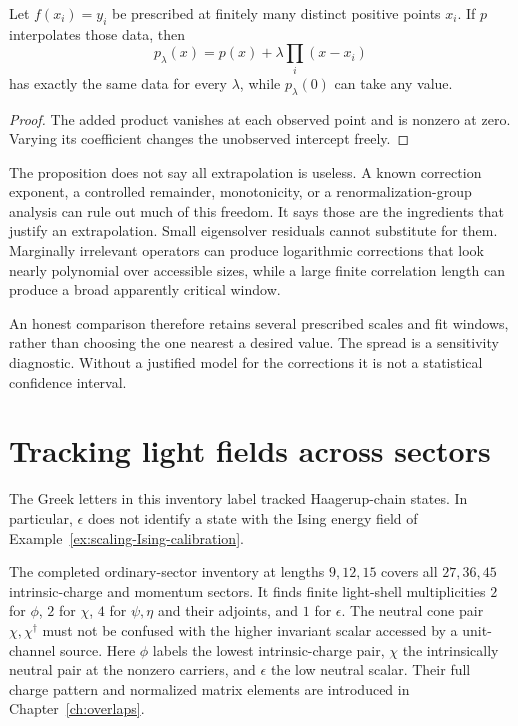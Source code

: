 \begin{proposition}
Let $f(x_i)=y_i$ be prescribed at finitely many distinct positive points
$x_i$. If $p$ interpolates those data, then
\[
 p_\lambda(x)=p(x)+\lambda\prod_i(x-x_i)
\]
has exactly the same data for every $\lambda$, while $p_\lambda(0)$ can
take any value.
\end{proposition}
\begin{proof}
The added product vanishes at each observed point and is nonzero at
zero. Varying its coefficient changes the unobserved intercept freely.
\end{proof}

The proposition does not say all extrapolation is useless. A known
correction exponent, a controlled remainder, monotonicity, or a
renormalization-group analysis can rule out much of this freedom.
It says those are the ingredients that justify an extrapolation. Small
eigensolver residuals cannot substitute for them. Marginally irrelevant
operators can produce logarithmic corrections that look nearly
polynomial over accessible sizes, while a large finite correlation
length can produce a broad apparently critical window.

An honest comparison therefore retains several prescribed scales and
fit windows, rather than choosing the one nearest a desired value.
The spread is a sensitivity diagnostic. Without a justified model for
the corrections it is not a statistical confidence interval.

\section{Tracking light fields across sectors}

The Greek letters in this inventory label tracked Haagerup-chain
states. In particular, $\epsilon$ does not identify a state with the
Ising energy field of Example~\ref{ex:scaling-Ising-calibration}.

The completed ordinary-sector inventory at lengths $9,12,15$ covers
all $27,36,45$ intrinsic-charge and momentum sectors. It finds finite
light-shell multiplicities $2$ for $\phi$, $2$ for $\chi$, $4$ for
$\psi,\eta$ and their adjoints, and $1$ for $\epsilon$. The neutral
cone pair $\chi,\chi^\dagger$ must not be confused with the higher
invariant scalar accessed by a unit-channel source.
Here $\phi$ labels the lowest intrinsic-charge pair, $\chi$ the
intrinsically neutral pair at the nonzero carriers, and $\epsilon$
the low neutral scalar. Their full charge pattern and normalized
matrix elements are introduced in Chapter~\ref{ch:overlaps}.

